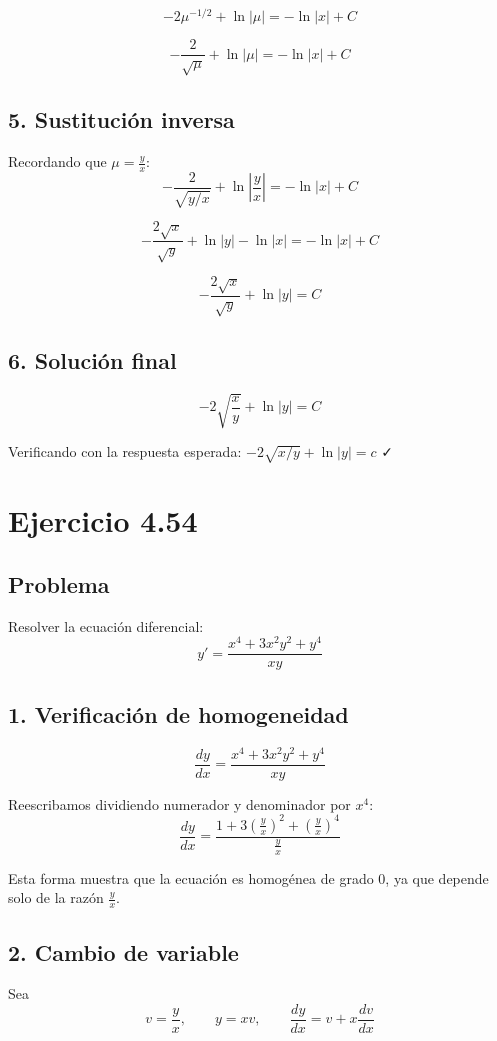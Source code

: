 \documentclass[a4paper,12pt]{article}
\begin{document}
\[
-2\mu^{-1/2} + \ln|\mu| = -\ln|x| + C
\]

\[
-\frac{2}{\sqrt{\mu}} + \ln|\mu| = -\ln|x| + C
\]

\subsection*{5. Sustitución inversa}
Recordando que $\mu = \frac{y}{x}$:
\[
-\frac{2}{\sqrt{y/x}} + \ln\left|\frac{y}{x}\right| = -\ln|x| + C
\]

\[
-\frac{2\sqrt{x}}{\sqrt{y}} + \ln|y| - \ln|x| = -\ln|x| + C
\]

\[
-\frac{2\sqrt{x}}{\sqrt{y}} + \ln|y| = C
\]

\subsection*{6. Solución final}
\[
\boxed{-2\sqrt{\frac{x}{y}} + \ln|y| = C}
\]

Verificando con la respuesta esperada: $-2\sqrt{x/y} + \ln|y| = c$ ✓

\newpage

\section{Ejercicio 4.54}
\subsection*{Problema}
Resolver la ecuación diferencial:
\[
y' = \frac{x^4 + 3x^2y^2 + y^4}{xy}
\]

\subsection*{1. Verificación de homogeneidad}
\[
\frac{dy}{dx} = \frac{x^4 + 3x^2y^2 + y^4}{xy}
\]

Reescribamos dividiendo numerador y denominador por $x^4$:
\[
\frac{dy}{dx} = \frac{1 + 3\left(\frac{y}{x}\right)^2 + \left(\frac{y}{x}\right)^4}{\frac{y}{x}}
\]

Esta forma muestra que la ecuación es homogénea de grado 0, ya que depende solo de la razón $\frac{y}{x}$.

\subsection*{2. Cambio de variable}
Sea 
\[
v = \frac{y}{x}, \qquad y = xv, \qquad \frac{dy}{dx} = v + x\frac{dv}{dx}
\]
\end{document}
